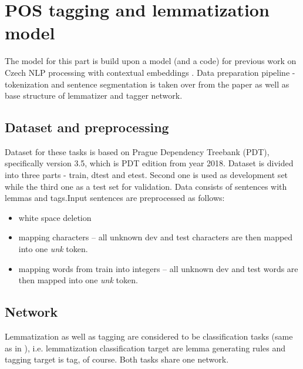  \section{POS tagging and lemmatization model}
The model for this part is build upon a model (and a code) for previous work on Czech NLP processing with contextual embeddings \cite[]{straka2019czech}. Data preparation %
pipeline - tokenization and sentence segmentation is taken over from the paper as well as base structure of lemmatizer and tagger network. 


\subsection{Dataset and preprocessing}
Dataset for these tasks is based on Prague Dependency Treebank (PDT), specifically version 3.5, which is PDT edition from year 2018. Dataset is divided into three parts - train, dtest and etest. Second one is used as development set while the third one as a test set for validation. %
Data consists of sentences with lemmas and tags.Input sentences are preprocessed as follows:
\begin{itemize}
\item white space deletion
\item mapping characters -- all unknown dev and test characters are then mapped into one \textit{unk} token. 
\item mapping  words from train into integers -- all unknown dev and test words are then mapped into one \textit{unk} token. 
\end{itemize}



		
\subsection{Network}
Lemmatization as well as tagging are considered to be classification tasks (same as in \cite[]{straka2019czech}), i.e. lemmatization classification target are lemma generating rules and tagging target is tag, of course. Both tasks share one network.

